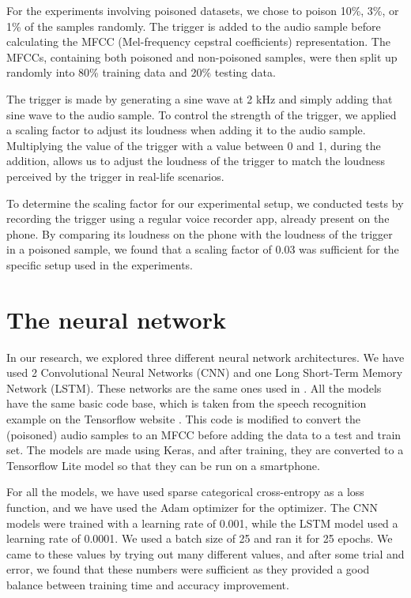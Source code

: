 \documentclass{report}
\theoremstyle{definition}
\theoremstyle{remark}
\begin{document}
For the experiments involving poisoned datasets, we chose to poison 10\%, 3\%, or 1\% of the samples randomly. The trigger is added to the audio sample before calculating the MFCC (Mel-frequency cepstral coefficients) representation. The MFCCs, containing both poisoned and non-poisoned samples, were then split up randomly into 80\% training data and 20\% testing data.

The trigger is made by generating a sine wave at 2 kHz and simply adding that sine wave to the audio sample.
To control the strength of the trigger, we applied a scaling factor to adjust its loudness when adding it to the audio sample. Multiplying the value of the trigger with a value between 0 and 1, during the addition, allows us to adjust the loudness of the trigger to match the loudness perceived by the trigger in real-life scenarios. 


To determine the scaling factor for our experimental setup, we conducted tests by recording the trigger using a regular voice recorder app, already present on the phone. By comparing its loudness on the phone with the loudness of the trigger in a poisoned sample, we found that a scaling factor of 0.03 was sufficient for the specific setup used in the experiments.

\section{The neural network}
In our research, we explored three different neural network architectures. We have used 2 Convolutional Neural Networks (CNN) and one Long Short-Term Memory Network (LSTM). These networks are the same ones used in \cite{CYHI}. All the models have the same basic code base, which is taken from the speech recognition example on the Tensorflow website \cite{TenserflowExample}. This code is modified to convert the (poisoned) audio samples to an MFCC before adding the data to a test and train set. The models are made using Keras, and after training, they are converted to a Tensorflow Lite model so that they can be run on a smartphone. 

For all the models, we have used sparse categorical cross-entropy as a loss function, and we have used the Adam optimizer for the optimizer. The CNN models were trained with a learning rate of 0.001, while the LSTM model used a learning rate of 0.0001. We used a batch size of 25 and ran it for 25 epochs. We came to these values by trying out many different values, and after some trial and error, we found that these numbers were sufficient as they provided a good balance between training time and accuracy improvement.
\end{document}
